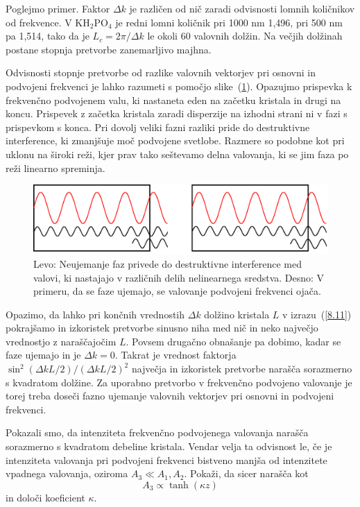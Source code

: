 \documentclass[11pt,fleqn]{book} %
\newcommand{\beq}{\begin{equation}}
\newcommand{\eeq}{\end{equation}}
\begin{document}
Poglejmo primer. Faktor $\Delta k$ je različen od nič zaradi odvisnosti
lomnih količnikov od frekvence. V KH$_{2}$PO$_{4}$ je 
redni lomni količnik pri 1000 nm 1,496, pri 500 nm pa 1,514, tako
da je $L_{c}=2\pi /\Delta k$ le okoli 60 valovnih dolžin. Na večjih dolžinah
postane stopnja pretvorbe zanemarljivo majhna.\\

\begin{remark}
Odvisnosti stopnje pretvorbe od razlike valovnih vektorjev pri osnovni
in podvojeni frekvenci je lahko razumeti s pomočjo slike~(\ref{fig:shg1}). Opazujmo
prispevka k frekvenčno podvojenem valu, ki nastaneta eden na začetku kristala
in drugi na koncu. Prispevek z začetka kristala zaradi disperzije na izhodni
strani ni v fazi s prispevkom s konca. Pri dovolj veliki fazni razliki
pride do destruktivne interference, ki zmanjšuje moč podvojene svetlobe.
Razmere so podobne kot pri uklonu na široki reži, kjer prav tako seštevamo
delna valovanja, ki se jim faza po reži linearno spreminja.
\begin{figure}[h]
\centering
\includegraphics[width=10truecm]{slike/08_shg1.png}
\caption{Levo: Neujemanje faz privede do destruktivne interference med valovi, ki nastajajo
v različnih delih nelinearnega sredstva. Desno: V primeru, da se faze ujemajo, se valovanje 
podvojeni frekvenci ojača.}
\label{fig:shg1}
\end{figure}
\end{remark}


Opazimo, da lahko pri končnih vrednostih $\Delta k$ dolžino kristala $L$ v izrazu~(\ref{8.11})
pokrajšamo in izkoristek pretvorbe sinusno niha med nič in neko največjo vrednostjo z naraščajočim
$L$. Povsem drugačno obnašanje pa dobimo, kadar se faze ujemajo in je $\Delta k = 0$. 
Takrat je vrednost faktorja $\sin^{2}(\Delta kL/2)/(\Delta kL/2)^{2}$ največja in izkoristek 
pretvorbe narašča sorazmerno s kvadratom dolžine. Za uporabno pretvorbo v frekvenčno 
podvojeno valovanje je torej treba doseči fazno ujemanje valovnih vektorjev pri 
osnovni in podvojeni frekvenci. 
\begin{definition}
Pokazali smo, da intenziteta frekvenčno podvojenega valovanja narašča sorazmerno s
kvadratom debeline kristala. Vendar velja ta odvisnost le, če je intenziteta valovanja
pri podvojeni frekvenci bistveno manjša od intenzitete vpadnega valovanja, oziroma $A_3 \ll A_1, A_2$.
Pokaži, da sicer narašča kot
\beq
A_3 \propto \tanh (\kappa z)
\eeq
in določi koeficient $\kappa$. 
\end{definition}
\end{document}
